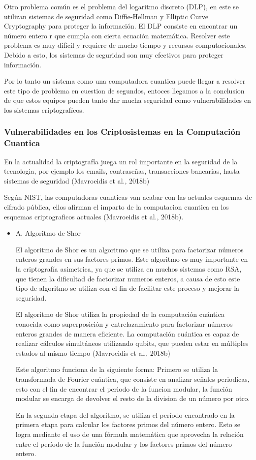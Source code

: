 \documentclass{article}
\begin{document}
Otro problema común es el problema del logaritmo discreto (DLP), en este se utilizan sistemas de seguridad como Diffie-Hellman y Elliptic Curve Cryptography para proteger la información. El DLP consiste en encontrar un número entero r que cumpla con cierta ecuación matemática. Resolver este problema es muy difícil y requiere de mucho tiempo y recursos computacionales. Debido a esto, los sistemas de seguridad son muy efectivos para proteger información.

Por lo tanto un sistema como una computadora cuantica puede llegar a resolver este tipo de problema en cuestion de segundos, entoces llegamos a la conclusion de que estos equipos pueden tanto dar mucha seguridad como vulnerabilidades en los sistemas criptografícos.

\subsubsection{Vulnerabilidades en los Criptosistemas en la Computación Cuantica}
        
En la actualidad la criptografía juega un rol importante en la seguridad de la tecnologia, por ejemplo los emails, contraseñas, transacciones bancarias, hasta sistemas de seguridad (Mavroeidis et al., 2018b)

Según NIST, las computadoras cuanticas van acabar con las actuales esquemas de cifrado pública, ellos afirman el imparto de la computacion cuantica en los esquemas criptograficos actuales (Mavroeidis et al., 2018b). 

\begin{itemize}
    \item{A}. Algoritmo de Shor

        El algoritmo de Shor es un algoritmo que se utiliza para factorizar números enteros grandes en sus factores primos. Este algoritmo es muy importante en la criptografía asimetrica, ya que se utiliza en muchos sistemas como RSA, que tienen la dificultad de factorizar numeros enteros, a causa de esto este tipo de algoritmo se utiliza con el fin de facilitar este proceso y mejorar la seguridad.

        El algoritmo de Shor utiliza la propiedad de la computación cuántica conocida como superposición y entrelazamiento para factorizar números enteros grandes de manera eficiente. La computación cuántica es capaz de realizar cálculos simultáneos utilizando qubits, que pueden estar en múltiples estados al mismo tiempo (Mavroeidis et al., 2018b)

        Este algoritmo funciona de la siguiente forma: Primero se utiliza la transformada de Fourier cuántica, que consiste en analizar señales periodicas, esto con el fin de encontrar el periodo de la funcion modular, la función modular se encarga de devolver el resto de la division de un número por otro.

        En la segunda etapa del algoritmo, se utiliza el período encontrado en la primera etapa para calcular los factores primos del número entero. Esto se logra mediante el uso de una fórmula matemática que aprovecha la relación entre el período de la función modular y los factores primos del número entero.
\end{itemize}
\end{document}
